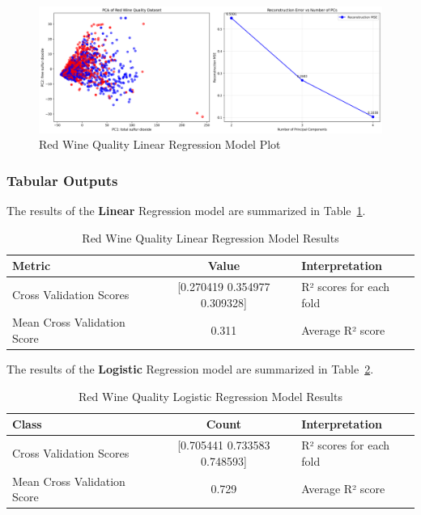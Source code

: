 \begin{figure}[htbp]
    \centering
    \includegraphics[width=\textwidth]{images/wine_quality_combined_analysis.png}
    \caption{Red Wine Quality Linear Regression Model Plot}\label{fig:red_wine_quality}
\end{figure}

\newpage
\subsubsection{Tabular Outputs}
The results of the \textbf{Linear} Regression model are summarized in Table~\ref{tab:red_wine_quality_results}.

\begin{table}[htbp]
    \centering
    \begin{tabular}{ || l || c || l || }
        \hline
        \textbf{Metric} & \textbf{Value} & \textbf{Interpretation} \\
        \hline\hline
        Cross Validation Scores & [0.270419 0.354977 0.309328] & R² scores for each fold \\
        \hline
        Mean Cross Validation Score & 0.311 & Average R² score \\
        \hline
    \end{tabular}
    \caption{Red Wine Quality Linear Regression Model Results}\label{tab:red_wine_quality_results}
\end{table}

\noindent The results of the \textbf{Logistic} Regression model are summarized in Table~\ref{tab:red_wine_quality_classification}.
\begin{table}[htbp]
    \centering
    \begin{tabular}{ || l || c || l || }
        \hline
        \textbf{Class} & \textbf{Count} & \textbf{Interpretation} \\
        \hline\hline
        Cross Validation Scores & [0.705441 0.733583 0.748593] & R² scores for each fold \\
        \hline
        Mean Cross Validation Score & 0.729 & Average R² score \\
        \hline
    \end{tabular}
    \caption{Red Wine Quality Logistic Regression Model Results}\label{tab:red_wine_quality_classification}
\end{table}

